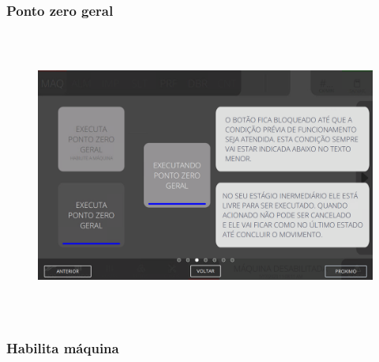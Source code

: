 \vspace*{\fill}

\newpage
\thispagestyle{fancy}

\vspace*{40 pt}

\subsubsection{\small{Ponto zero geral}}

\vspace*{\fill}

\begin{figure}[h]
  \centering
  \includegraphics[width=576px,height=360px]{src/imagesFlexo/02-machine/e-3.png}
\end{figure}

\vspace*{\fill}

\newpage
\thispagestyle{fancy}

\vspace*{40 pt}

\subsubsection{\small{Habilita máquina}}

\vspace*{\fill}

